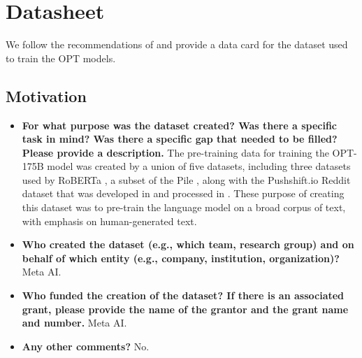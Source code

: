 \documentclass[11pt]{article}
\begin{document}
\section{Datasheet}
\label{sec:datasheet}
We follow the recommendations of \citet{gebru2021} and provide a data card for the dataset used to train the OPT models. 

\subsection{Motivation}
\begin{itemize}
    \item \textbf{For what purpose was the dataset created? Was there a specific task in mind? Was there a specific gap that needed to be filled? Please provide a description.} The pre-training data for training the OPT-175B model was created by a union of five datasets, including three datasets used by RoBERTa \cite{liu2019roberta}, a subset of the Pile \cite{thepile}, along with the Pushshift.io Reddit dataset that was developed in \cite{reddit2020} and processed in \cite{roller-etal-2021-recipes}. These purpose of creating this dataset was to pre-train the language model on a broad corpus of text, with emphasis on human-generated text.
    \item \textbf{Who created the dataset (e.g., which team, research group) and on behalf of which entity (e.g., company, institution, organization)?} Meta AI.
    \item \textbf{Who funded the creation of the dataset? If there is an associated grant, please provide the name of the grantor and the grant name and number.} Meta AI.
    \item \textbf{Any other comments?} No.
\end{itemize}
\end{document}
